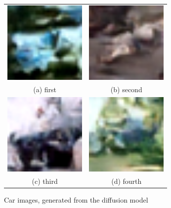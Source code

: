 \documentclass[conference]{IEEEtran}
\begin{document}
  \begin{figure}
    \begin{tabular}{cc}
      \includegraphics[width=40mm]{./images/generated-imgs/car/0102.png} 
  &   \includegraphics[width=40mm]{./images/generated-imgs/car/0103.png} 
  \\
    (a) first 
    & (b) second \\[6pt]
       \includegraphics[width=40mm]{./images/generated-imgs/car/0104.png} 
    &  \includegraphics[width=40mm]{./images/generated-imgs/car/0105.png} 
  \\
    (c) third & (d) fourth \\[6pt]
    \end{tabular}
    \caption{Car images, generated from the diffusion model}
    \end{figure}
\end{document}
